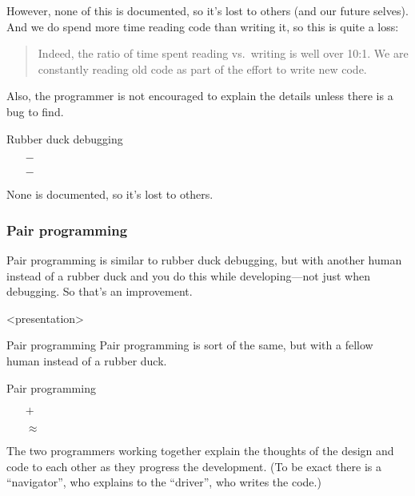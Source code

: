 However, none of this is documented, so it's lost to others (and our future 
selves).
And we do spend more time reading code than writing it, so this is quite a 
loss: \blockcquote[p.~14]{CleanCode}{%
  Indeed, the ratio of time spent reading vs.~writing is well over 10:1.
  We are constantly reading old code as part of the effort to write new code.%
}
Also, the programmer is not encouraged to explain the details unless there is a 
bug to find.

\begin{frame}
\begin{block}{Rubber duck debugging}
  \begin{itemize}
    \item[\(-\)] {\color{red}\LPexplain}
    \item[\(-\)] {\color{red}\LPorder}
  \end{itemize}
\end{block}
\begin{remark}
  None is documented, so it's lost to others.
\end{remark}
\end{frame}

\subsubsection{Pair programming}

Pair programming is similar to rubber duck debugging, but with another human 
instead of a rubber duck and you do this while developing---not just when 
debugging.
So that's an improvement.

\begin{frame}<presentation>
\begin{block}{Pair programming}
  Pair programming is sort of the same, but with a fellow human instead of a 
  rubber duck.
\end{block}

\begin{block}{Pair programming}
  \begin{itemize}
    \item[\(+\)] {\color{green!75!black}\LPexplain}
    \item[\(\approx\)] {\color{orange}\LPorder}
  \end{itemize}
\end{block}
\end{frame}

The two programmers working together explain the thoughts of the design and 
code to each other as they progress the development.
(To be exact there is a \enquote{navigator}, who explains to the 
\enquote{driver}, who writes the code.)

